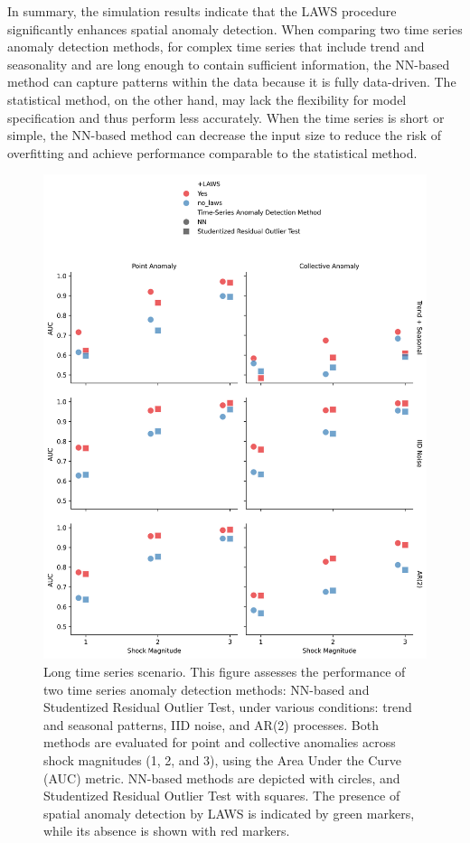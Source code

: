 \documentclass[11pt]{article}
\begin{document}
In summary, the simulation results indicate that the LAWS procedure significantly enhances spatial anomaly detection. When comparing two time series anomaly detection methods, for complex time series that include trend and seasonality and are long enough to contain sufficient information, the NN-based method can capture patterns within the data because it is fully data-driven. The statistical method, on the other hand, may lack the flexibility for model specification and thus perform less accurately. When the time series is short or simple, the NN-based method can decrease the input size to reduce the risk of overfitting and achieve performance comparable to the statistical method.



\begin{figure}[h]
    \centering
    \includegraphics[width=\textwidth]{../figure/simulation_long_time_series.png}
    \caption{Long time series scenario. This figure assesses the performance of two time series anomaly detection methods: NN-based and Studentized Residual Outlier Test, under various conditions: trend and seasonal patterns, IID noise, and AR(2) processes. Both methods are evaluated for point and collective anomalies across shock magnitudes (1, 2, and 3), using the Area Under the Curve (AUC) metric. NN-based methods are depicted with circles, and Studentized Residual Outlier Test with squares. The presence of spatial anomaly detection by LAWS is indicated by green markers, while its absence is shown with red markers.}
    \label{fig: simulation long time series}
\end{figure}
\end{document}
